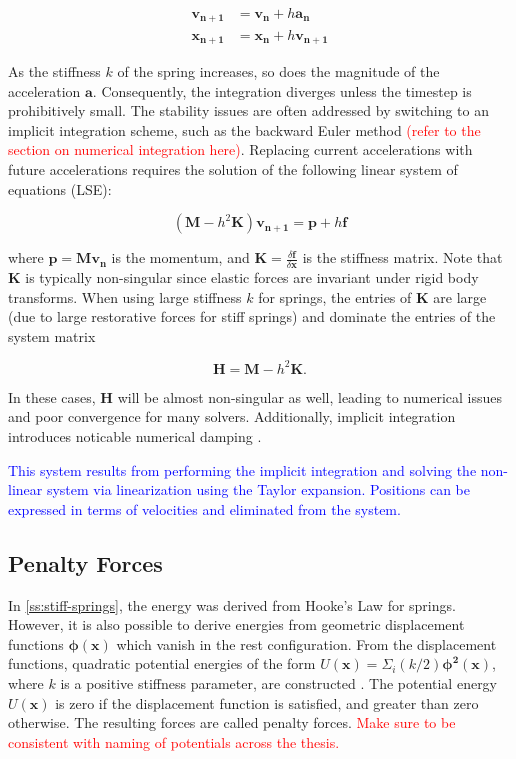 \begin{align*}
    \bm{v_{n+1}} &= \bm{v_n} + h\bm{a_n} \\
    \bm{x_{n+1}} &= \bm{x_n} + h\bm{v_{n+1}}
\end{align*}

As the stiffness $k$ of the spring increases, so does the magnitude of the acceleration $\bm{a}$. Consequently, the integration
diverges unless the timestep is prohibitively small. The stability issues are often addressed by switching to an implicit 
integration scheme, such as the backward Euler method \cite{baraff1998} \textcolor{red}{(refer to the section on numerical 
integration here)}. Replacing current accelerations with future accelerations requires the solution of the following linear 
system of equations (LSE):

\[
    (\bm{M} - h^2\bm{K})\bm{v_{n+1}} = \bm{p} + h\bm{f}
\]

where $\bm{p} = \bm{Mv_n}$ is the momentum, and $\bm{K} = \frac{\delta \bm{f}}{\delta \bm{x}}$ is the stiffness matrix. Note that 
$\bm{K}$ is typically non-singular since elastic forces are invariant under rigid body transforms. When using large stiffness 
$k$ for springs, the entries of $\bm{K}$ are large (due to large restorative forces for stiff springs) and dominate the entries 
of the system matrix 

\begin{equation}\label{eq:system-H}
    \bm{H} = \bm{M} - h^2\bm{K}.
\end{equation}

In these cases, $\bm{H}$ will be almost non-singular as well, leading to numerical issues and poor convergence for many solvers. 
Additionally, implicit integration introduces noticable numerical damping \cite{servin2006}.

\textcolor{blue}{This system results from performing the implicit integration and solving the non-linear system via linearization
using the Taylor expansion. Positions can be expressed in terms of velocities and eliminated from the system.}

\subsection{Penalty Forces}\label{ss:penalty-forces}
In \cref{ss:stiff-springs}, the energy was derived from Hooke's Law for springs. However, it is also possible to derive energies from 
geometric displacement functions $\bm{\phi(x)}$ which vanish in the rest configuration. From the displacement functions, quadratic 
potential energies of the form $U(\bm{x}) = \Sigma_i (k / 2) \bm{\phi^2(x)}$, where $k$ is a positive stiffness parameter, are 
constructed \cite{terz1987}. The potential energy $U(\bm{x})$ is zero if the displacement function is satisfied, and greater than 
zero otherwise. The resulting forces are called penalty forces. \textcolor{red}{Make sure to be consistent with naming of potentials
across the thesis.}

